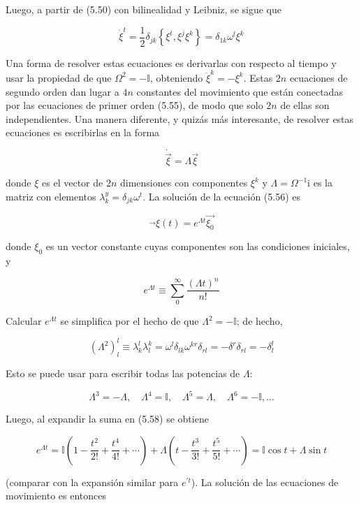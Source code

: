 Luego, a partir de (5.50) con bilinealidad y Leibniz, se sigue que

\[
\dot{\xi}^t = \frac{1}{2} \delta_{j k} \left\{ \xi^t, \xi^j \xi^k \right\} = \delta_{1 k} \omega^l \xi^k \tag{5.55}
\]

Una forma de resolver estas ecuaciones es derivarlas con respecto al tiempo y usar la propiedad de que \( \Omega^{2} = -\mathbb{I} \), obteniendo \( \ddot{\xi}^{k} = -\xi^{k} \). Estas \( 2n \) ecuaciones de segundo orden dan lugar a \( 4n \) constantes del movimiento que están conectadas por las ecuaciones de primer orden (5.55), de modo que solo \( 2n \) de ellas son independientes. Una manera diferente, y quizás más interesante, de resolver estas ecuaciones es escribirlas en la forma

\[
\dot{\vec{\xi}} = \Lambda \vec{\xi} \tag{5.56}
\]

donde \( \xi \) es el vector de \( 2n \) dimensiones con componentes \( \xi^{k} \) y \( \Lambda =\Omega^{-1}\mathrm{i}\) es la matriz con elementos \( \lambda_{k}^{y} = \delta_{j k} \omega^{t} \). La solución de la ecuación (5.56) es

\[
\vec{}{\xi}(t) = e^{\Lambda t} \vec{\xi_{0}} \tag{5.57}
\]

donde \( \xi_{0} \) es un vector constante cuyas componentes son las condiciones iniciales, y

\[
e^{\Lambda t} \equiv \sum_{0}^{\infty} \frac{(\Lambda t)^n}{n!} \tag{5.58}
\]

Calcular \( e^{\Lambda t} \) se simplifica por el hecho de que \( \Lambda^{2} = -\mathbb{I} \); de hecho,

\[
\left( \Lambda^{2} \right)_{l}^{l} \equiv \lambda_{k}^{l} \lambda_{l}^{k} = \omega^{l} \delta_{l k} \omega^{k r} \delta_{r l} = -\delta^{r} \delta_{r l} = -\delta_{l}^{l}
\]

Esto se puede usar para escribir todas las potencias de \( \Lambda \):

\[
\Lambda^{3} = -\Lambda, \quad \Lambda^{4} = \mathbb{I}, \quad \Lambda^{5} = \Lambda, \quad \Lambda^{6} = -\mathbb{I}, \ldots
\]

Luego, al expandir la suma en (5.58) se obtiene

\[
e^{\Lambda t} = \mathbb{I} \left( 1 - \frac{t^2}{2!} + \frac{t^4}{4!} + \cdots \right) + \Lambda \left( t - \frac{t^3}{3!} + \frac{t^5}{5!} + \cdots \right)
= \mathbb{I} \cos t + \Lambda \sin t
\]

(comparar con la expansión similar para \( e^{\prime t} \)). La solución de las ecuaciones de movimiento es entonces

